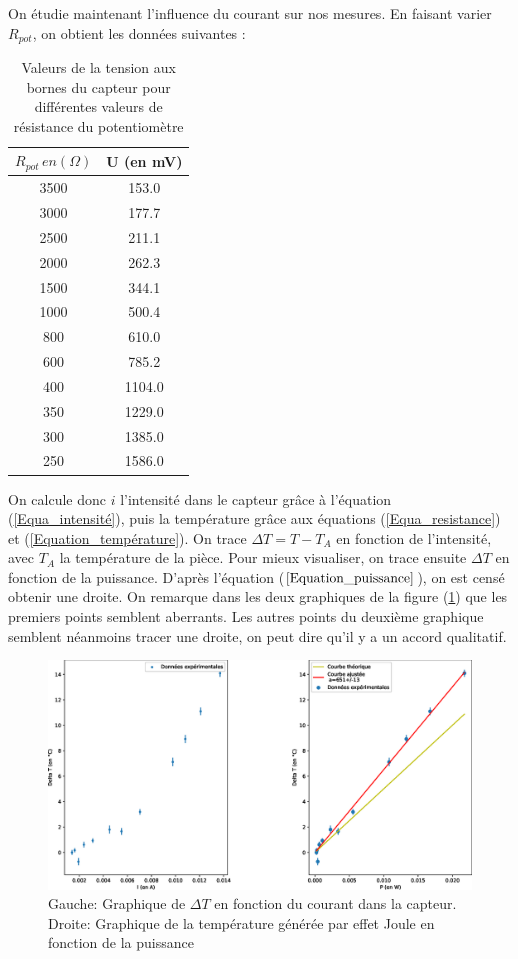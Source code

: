 \documentclass[12pt]{article}
\begin{document}
On étudie maintenant l'influence du courant sur nos mesures. En faisant varier $R_{pot}$, on obtient les données suivantes :
\begin{table}[h!]
	\begin{center}
		\begin{tabular}{|c|c|}
\hline
 $R_{pot}\, en (\Omega)$ &  U (en mV) \\
\hline
  3500 &      153.0 \\
  3000 &      177.7 \\
  2500 &      211.1 \\
  2000 &      262.3 \\
  1500 &      344.1 \\
  1000 &      500.4 \\
   800 &      610.0 \\
   600 &      785.2 \\
   400 &     1104.0 \\
   350 &     1229.0 \\
   300 &     1385.0 \\
   250 &     1586.0 \\
\hline
\end{tabular}
	\end{center}
	\label{Tableau_puissance}
	\caption{Valeurs de la tension aux bornes du capteur pour différentes valeurs de résistance du potentiomètre}
\end{table}

On calcule donc $i$ l'intensité dans le capteur grâce à l'équation (\ref{Equa_intensité}), puis la température grâce aux équations (\ref{Equa_resistance}) et (\ref{Equation_température}). On trace $\Delta T=T-T_A$ en fonction de l'intensité, avec $T_A$ la température de la pièce. Pour mieux visualiser, on trace ensuite $\Delta T$ en fonction de la puissance. D'après l'équation ($\ref{Equation_puissance}$), on est censé obtenir une droite. On remarque dans les deux graphiques de la figure (\ref{Graphe_puissance}) que les premiers points semblent aberrants. Les autres points du deuxième graphique semblent néanmoins tracer une droite, on peut dire qu'il y a un accord qualitatif.
\begin{figure}[h!]
	\begin{center}
		\includegraphics[scale=0.5]{Graphe2_puissance.eps}		
		\caption{Gauche: Graphique de $\Delta T$ en fonction du courant dans la capteur. Droite: Graphique de la température générée par effet Joule en fonction de la puissance}
		\label{Graphe_puissance}
	\end{center}
\end{figure}
\end{document}
